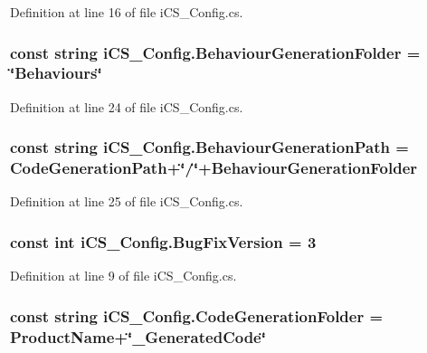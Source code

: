 Definition at line 16 of file i\+C\+S\+\_\+\+Config.\+cs.

\hypertarget{classi_c_s___config_ab151f2194203643fef8497b327b8d878}{
\subsubsection[{Behaviour\+Generation\+Folder}]{\setlength{\rightskip}{0pt plus 5cm}const string i\+C\+S\+\_\+\+Config.\+Behaviour\+Generation\+Folder = \char`\"{}Behaviours\char`\"{}}}\label{classi_c_s___config_ab151f2194203643fef8497b327b8d878}


Definition at line 24 of file i\+C\+S\+\_\+\+Config.\+cs.

\hypertarget{classi_c_s___config_afcd9d55f10a72604d909c8f6056c1518}{
\subsubsection[{Behaviour\+Generation\+Path}]{\setlength{\rightskip}{0pt plus 5cm}const string i\+C\+S\+\_\+\+Config.\+Behaviour\+Generation\+Path = {\bf Code\+Generation\+Path}+\char`\"{}/\char`\"{}+{\bf Behaviour\+Generation\+Folder}}}\label{classi_c_s___config_afcd9d55f10a72604d909c8f6056c1518}


Definition at line 25 of file i\+C\+S\+\_\+\+Config.\+cs.

\hypertarget{classi_c_s___config_af7f6930e44af226c2c4c3a28ad40aa05}{
\subsubsection[{Bug\+Fix\+Version}]{\setlength{\rightskip}{0pt plus 5cm}const int i\+C\+S\+\_\+\+Config.\+Bug\+Fix\+Version = 3}}\label{classi_c_s___config_af7f6930e44af226c2c4c3a28ad40aa05}


Definition at line 9 of file i\+C\+S\+\_\+\+Config.\+cs.

\hypertarget{classi_c_s___config_a79ee0c6f9afd0a4b5bdb49b41688f9c7}{
\subsubsection[{Code\+Generation\+Folder}]{\setlength{\rightskip}{0pt plus 5cm}const string i\+C\+S\+\_\+\+Config.\+Code\+Generation\+Folder = {\bf Product\+Name}+\char`\"{}\+\_\+\+Generated\+Code\char`\"{}}}\label{classi_c_s___config_a79ee0c6f9afd0a4b5bdb49b41688f9c7}



